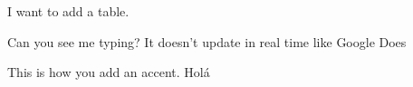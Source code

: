 
I want to add a table.

Can you see me typing? It doesn't update in real time like Google Does 

This is how you add an accent. Holá
